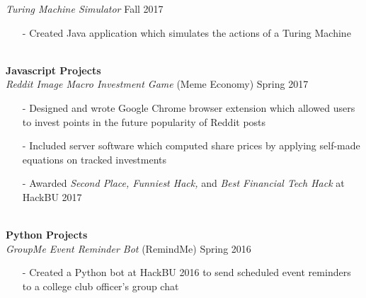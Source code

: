 \documentclass[11pt]{article}
\newcommand{\Indent}{\indent\indent}
\begin{document}
            \Indent \small\textit{Turing Machine Simulator} \hfill \small{Fall 2017}\indent\\
                \Indent\begin{minipage}{\dimexpr\textwidth-6cm}
                    \begin{itemize}[noitemsep, topsep=0pt]
                        \item[-] Created Java application which simulates the actions of a Turing Machine
                    \end{itemize}\vspace{0mm}
                \end{minipage}\\
        \indent \small\textbf{Javascript Projects}\\
            \Indent \small\textit{Reddit Image Macro Investment Game}\small{ (Meme Economy)} \hfill \small{Spring 2017}\indent\vspace{0.5mm}\\
                \Indent\begin{minipage}{\dimexpr\textwidth-6cm}
                    \begin{itemize}[noitemsep, topsep=0pt]
                        \item[-] Designed and wrote Google Chrome browser extension which allowed users to invest points in the future popularity of Reddit posts
                        \item[-] Included server software which computed share prices by applying self-made equations on tracked investments
                        \item[-] Awarded \textit{Second Place, Funniest Hack,} and \textit{Best Financial Tech Hack} at HackBU 2017
                    \end{itemize}\vspace{0mm}
                \end{minipage}\\
        \indent \small\textbf{Python Projects}\\
            \Indent \small\textit{GroupMe Event Reminder Bot}\small{ (RemindMe)} \hfill \small{Spring 2016}\indent\vspace{0.5mm}\\
                \Indent\begin{minipage}{\dimexpr\textwidth-6cm}
                    \begin{itemize}[noitemsep, topsep=0pt]
                        \item[-] Created a Python bot at HackBU 2016 to send scheduled event reminders to a college club officer's group chat
                    \end{itemize}\vspace{0mm}
                \end{minipage}
\end{document}
